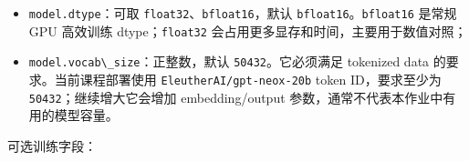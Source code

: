 \documentclass[
]{ctexart}
\newcommand{\passthrough}[1]{#1}
\begin{document}
\begin{itemize}
\item
  \passthrough{\lstinline!model.dtype!}：可取
  \passthrough{\lstinline!float32!}、\passthrough{\lstinline!bfloat16!}，默认
  \passthrough{\lstinline!bfloat16!}。\passthrough{\lstinline!bfloat16!}
  是常规 GPU 高效训练 dtype；\passthrough{\lstinline!float32!}
  会占用更多显存和时间，主要用于数值对照；
\item
  \passthrough{\lstinline!model.vocab\_size!}：正整数，默认
  \passthrough{\lstinline!50432!}。它必须满足 tokenized data
  的要求。当前课程部署使用
  \passthrough{\lstinline!EleutherAI/gpt-neox-20b!} token ID，要求至少为
  \passthrough{\lstinline!50432!}；继续增大它会增加 embedding/output
  参数，通常不代表本作业中有用的模型容量。
\end{itemize}

可选训练字段：
\end{document}
